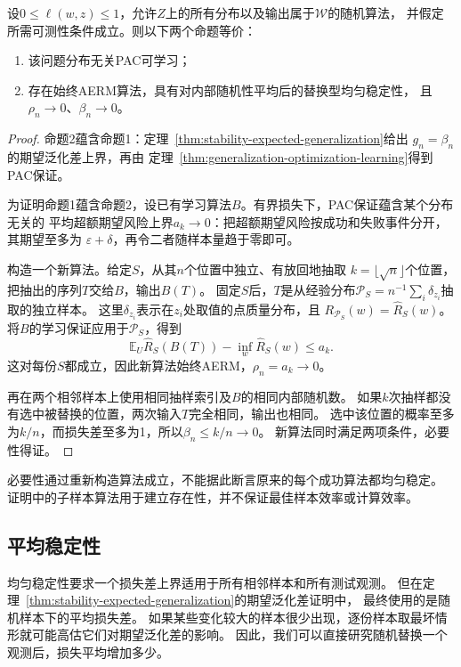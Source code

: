 \begin{theorem}
\label{thm:general-stability-characterization}
设$0\leq\ell(w,z)\leq1$，允许$Z$上的所有分布以及输出属于$\mathcal W$的随机算法，
并假定所需可测性条件成立。则以下两个命题等价：
\begin{enumerate}
 \item 该问题分布无关PAC可学习；
 \item 存在始终AERM算法，具有对内部随机性平均后的替换型均匀稳定性，
 且$\rho_n\to0$、$\beta_n\to0$。
\end{enumerate}
\end{theorem}
\begin{proof}
命题2蕴含命题1：定理~\ref{thm:stability-expected-generalization}给出
$g_n=\beta_n$的期望泛化差上界，再由
定理~\ref{thm:generalization-optimization-learning}得到PAC保证。

为证明命题1蕴含命题2，设已有学习算法$B$。有界损失下，PAC保证蕴含某个分布无关的
平均超额期望风险上界$a_k\to0$：把超额期望风险按成功和失败事件分开，其期望至多为
$\varepsilon+\delta$，再令二者随样本量趋于零即可。

构造一个新算法。给定$S$，从其$n$个位置中独立、有放回地抽取
$k=\lfloor\sqrt n\rfloor$个位置，把抽出的序列$T$交给$B$，输出$B(T)$。
固定$S$后，$T$是从经验分布$\mathcal P_S=n^{-1}\sum_i\delta_{z_i}$抽取的独立样本。
这里$\delta_{z_i}$表示在$z_i$处取值的点质量分布，且
$R_{\mathcal P_S}(w)=\hat R_S(w)$。将$B$的学习保证应用于$\mathcal P_S$，得到
\[
 \mathbb E_U\hat R_S(B(T))-\inf_w\hat R_S(w)\leq a_k.
\]
这对每份$S$都成立，因此新算法始终AERM，$\rho_n=a_k\to0$。

再在两个相邻样本上使用相同抽样索引及$B$的相同内部随机数。
如果$k$次抽样都没有选中被替换的位置，两次输入$T$完全相同，输出也相同。
选中该位置的概率至多为$k/n$，而损失差至多为1，所以$\beta_n\leq k/n\to0$。
新算法同时满足两项条件，必要性得证。
\end{proof}

必要性通过重新构造算法成立，不能据此断言原来的每个成功算法都均匀稳定。
证明中的子样本算法用于建立存在性，并不保证最佳样本效率或计算效率。

\subsection{平均稳定性}
\label{sec:on-average-stability}

均匀稳定性要求一个损失差上界适用于所有相邻样本和所有测试观测。
但在定理~\ref{thm:stability-expected-generalization}的期望泛化差证明中，
最终使用的是随机样本下的平均损失差。
如果某些变化较大的样本很少出现，逐份样本取最坏情形就可能高估它们对期望泛化差的影响。
因此，我们可以直接研究随机替换一个观测后，损失平均增加多少。

